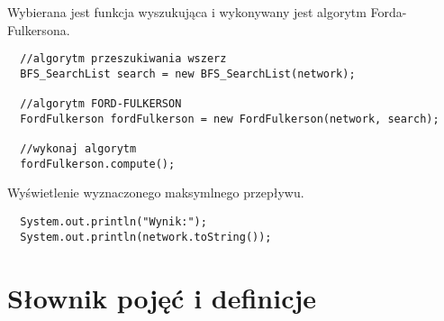 \documentclass[10pt]{minutes}
\begin{document}
Wybierana jest funkcja wyszukująca i wykonywany jest algorytm Forda-Fulkersona.
\begin{lstlisting}
  //algorytm przeszukiwania wszerz
  BFS_SearchList search = new BFS_SearchList(network);

  //algorytm FORD-FULKERSON
  FordFulkerson fordFulkerson = new FordFulkerson(network, search);

  //wykonaj algorytm
  fordFulkerson.compute();
\end{lstlisting}

Wyświetlenie wyznaczonego maksymlnego przepływu.
\begin{lstlisting}        
  System.out.println("Wynik:");
  System.out.println(network.toString());
\end{lstlisting}
       

\section{Słownik pojęć i definicje}
\end{document}
